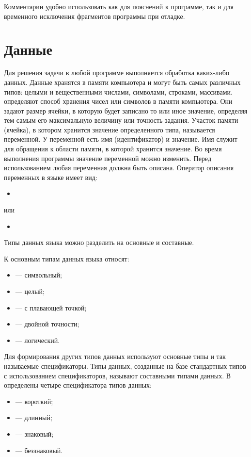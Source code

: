Комментарии удобно использовать как для пояснений к программе, так и для временного исключения фрагментов программы при
отладке.

\section[Данные]{Данные}
Для решения задачи в любой программе выполняется обработка каких-либо данных. Данные хранятся в памяти компьютера и
могут быть самых различных типов: целыми и вещественными числами, символами, строками, массивами.  определяют способ хранения чисел или символов в памяти компьютера. Они задают
размер ячейки, в которую будет записано то или иное значение, определяя тем самым его максимальную величину или
точность задания. Участок памяти (ячейка), в котором хранится значение определенного типа, называется
переменной. У переменной есть имя
(идентификатор) и значение. Имя служит для обращения к области памяти, в
которой хранится значение. Во время выполнения программы значение переменной можно изменить. Перед использованием любая
переменная должна быть описана. Оператор описания переменных в языке 
имеет вид:
\begin{itemize}
\item[] 
\end{itemize}
или
\begin{itemize}
\item[] 
\end{itemize}

Типы данных языка  можно разделить на основные и составные.

К основным типам данных языка относят:
\begin{itemize}
\item {} --- символьный; 
\item {} --- целый; 
\item {} --- с плавающей точкой; 
\item {} --- двойной точности; 
\item {} --- логический.
\end{itemize}

Для формирования других типов данных используют основные типы и так называемые спецификаторы. Типы данных, созданные на
базе стандартных типов с использованием спецификаторов, называют составными типами данных. 
В  определены четыре спецификатора типов данных:
\begin{itemize}
\item {} --- короткий;
\item {} --- длинный;
\item {} --- знаковый;
\item {} --- беззнаковый.
\end{itemize}

